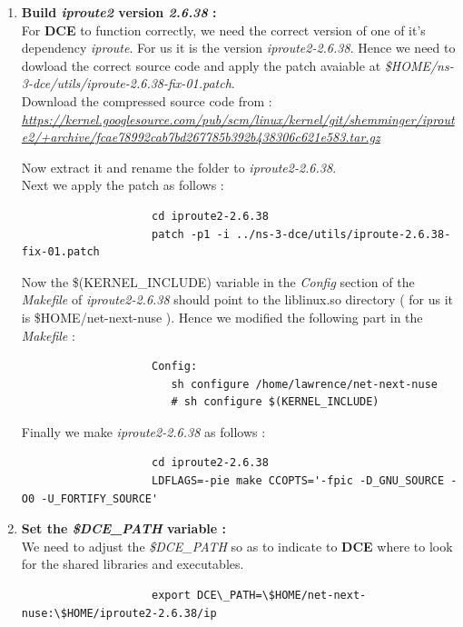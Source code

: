 \documentclass[a4paper,11pt]{article}
\begin{document}
\begin{enumerate}
			\item \textbf{Build \emph{iproute2} version \emph{2.6.38} :} \\For \textbf{DCE} to function correctly, we need the correct version of one of it's dependency \emph{iproute}. For us it is the version \emph{iproute2-2.6.38}. Hence we need to dowload the correct source code and apply the patch avaiable at \emph{\$HOME/ns-3-dce/utils/iproute-2.6.38-fix-01.patch}. \\

			Download the compressed source code from :
					\nohyphens{\emph{\url{https://kernel.googlesource.com/pub/scm/linux/kernel/git/shemminger/iproute2/+archive/fcae78992cab7bd267785b392b438306c621e583.tar.gz}}}

			Now extract it and rename the folder to \emph{iproute2-2.6.38}.\\
			Next we apply the patch as follows :
				\begin{lstlisting}
					cd iproute2-2.6.38
					patch -p1 -i ../ns-3-dce/utils/iproute-2.6.38-fix-01.patch
				\end{lstlisting}
			Now the \$(KERNEL\_INCLUDE) variable in the \emph{Config} section of the \emph{Makefile} of \emph{iproute2-2.6.38} should point to the liblinux.so directory ( for us it is \$HOME/net-next-nuse ). Hence we modified the following part in the \emph{Makefile} :

				\begin{lstlisting}	
					Config:
	                   sh configure /home/lawrence/net-next-nuse
	                   # sh configure $(KERNEL_INCLUDE)
	            \end{lstlisting}
	        Finally we make \emph{iproute2-2.6.38} as follows : 
	        	\begin{lstlisting}
	        		cd iproute2-2.6.38
	                LDFLAGS=-pie make CCOPTS='-fpic -D_GNU_SOURCE -O0 -U_FORTIFY_SOURCE'
	            \end{lstlisting}

				

			\item \textbf{Set the \emph{\$DCE\_PATH} variable :}\\
			We need to adjust the \emph{\$DCE\_PATH} so as to indicate to \textbf{DCE} where to look for the shared libraries and executables.
				\begin{lstlisting}
					export DCE\_PATH=\$HOME/net-next-nuse:\$HOME/iproute2-2.6.38/ip
				\end{lstlisting}


\end{enumerate}
\end{document}
